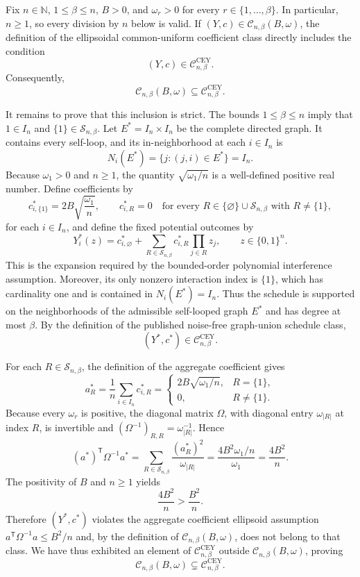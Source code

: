 Fix \(n\in\mathbb N\), \(1\leq\beta\leq n\), \(B>0\), and \(\omega_r>0\) for every \(r\in\{1,\ldots,\beta\}\).  In particular, \(n\geq1\), so every division by \(n\) below is valid.  If \((Y,c)\in\mathcal C_{n,\beta}(B,\omega)\), the definition of the ellipsoidal common-uniform coefficient class directly includes the condition
\[
(Y,c)\in\mathcal C^{\mathrm{CEY}}_{n,\beta}.
\]
Consequently,
\[
\mathcal C_{n,\beta}(B,\omega)
\subseteq
\mathcal C^{\mathrm{CEY}}_{n,\beta}.
\]

It remains to prove that this inclusion is strict.  The bounds \(1\leq\beta\leq n\) imply that \(1\in I_n\) and \(\{1\}\in\mathcal S_{n,\beta}\).  Let \(E^*=I_n\times I_n\) be the complete directed graph.  It contains every self-loop, and its in-neighborhood at each \(i\in I_n\) is
\[
N_i(E^*)=\{j:(j,i)\in E^*\}=I_n.
\]
Because \(\omega_1>0\) and \(n\geq1\), the quantity \(\sqrt{\omega_1/n}\) is a well-defined positive real number.  Define coefficients by
\[
c^*_{i,\{1\}}=2B\sqrt{\frac{\omega_1}{n}},
\qquad
c^*_{i,R}=0
\quad
\text{for every }R\in\{\varnothing\}\cup\mathcal S_{n,\beta}
\text{ with }R\neq\{1\},
\]
for each \(i\in I_n\), and define the fixed potential outcomes by
\[
Y_i^*(z)=c^*_{i,\varnothing}
+\sum_{R\in\mathcal S_{n,\beta}}c^*_{i,R}
  \prod_{j\in R}z_j,
\qquad z\in\{0,1\}^n.
\]
This is the expansion required by the bounded-order polynomial interference assumption.  Moreover, its only nonzero interaction index is \(\{1\}\), which has cardinality one and is contained in \(N_i(E^*)=I_n\).  Thus the schedule is supported on the neighborhoods of the admissible self-looped graph \(E^*\) and has degree at most \(\beta\).  By the definition of the published noise-free graph-union schedule class,
\[
(Y^*,c^*)\in\mathcal C^{\mathrm{CEY}}_{n,\beta}.
\]

For each \(R\in\mathcal S_{n,\beta}\), the definition of the aggregate coefficient gives
\[
a_R^*
=\frac1n\sum_{i\in I_n}c^*_{i,R}
=
\begin{cases}
2B\sqrt{\omega_1/n},&R=\{1\},\\
0,&R\neq\{1\}.
\end{cases}
\]
Because every \(\omega_r\) is positive, the diagonal matrix \(\Omega\), with diagonal entry \(\omega_{|R|}\) at index \(R\), is invertible and \((\Omega^{-1})_{R,R}=\omega_{|R|}^{-1}\).  Hence
\[
(a^*)^{\mathsf T}\Omega^{-1}a^*
=\sum_{R\in\mathcal S_{n,\beta}}
  \frac{(a_R^*)^2}{\omega_{|R|}}
=\frac{4B^2\omega_1/n}{\omega_1}
=\frac{4B^2}{n}.
\]
The positivity of \(B\) and \(n\geq1\) yields
\[
\frac{4B^2}{n}>\frac{B^2}{n}.
\]
Therefore \((Y^*,c^*)\) violates the aggregate coefficient ellipsoid assumption \(a^{\mathsf T}\Omega^{-1}a\leq B^2/n\) and, by the definition of \(\mathcal C_{n,\beta}(B,\omega)\), does not belong to that class.  We have thus exhibited an element of \(\mathcal C^{\mathrm{CEY}}_{n,\beta}\) outside \(\mathcal C_{n,\beta}(B,\omega)\), proving
\[
\mathcal C_{n,\beta}(B,\omega)
\subsetneq
\mathcal C^{\mathrm{CEY}}_{n,\beta}.
\]